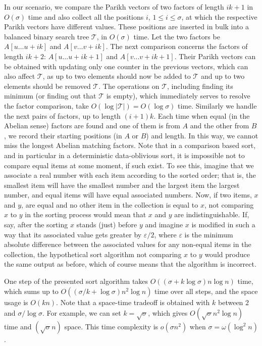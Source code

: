 \documentclass{llncs}
\begin{document}
In our scenario, we compare the Parikh vectors of two factors 
of length $ik+1$ in $O(\sigma)$ time 
and also collect all the positions $i$, $1 \leq i \leq \sigma$, 
at which the respective Parikh vectors have different values.
These positions are inserted in bulk into a balanced binary search 
tree $\mathcal{T}$, in $O(\sigma)$ time.
Let the two factors be $A[u \ldots u+ik]$ and $A[v \ldots v+ik]$.
The next comparison concerns the factors of length $ik+2$: 
$A[u \ldots u+ik+1]$ and $A[v \ldots v+ik+1]$.
Their Parikh vectors can be obtained with updating only one counter 
in the previous vectors, which can also affect $\mathcal{T}$, 
as up to two elements should now be added to $\mathcal{T}$ 
and up to two elements should be removed $\mathcal{T}$. 
The operations on $\mathcal{T}$, including finding its minimum 
(or finding out that $\mathcal{T}$ is empty), 
which immediately serves to resolve the factor comparison, 
take $O(\log|\mathcal{T}|) = O(\log\sigma)$ time.
Similarly we handle the next pairs of factors, up to length $(i+1)k$.
Each time when equal (in the Abelian sense) factors are found 
and one of them is from $A$ and the other from $B$, 
we record their starting positions (in $A$ or $B$) and length.
In this way, we cannot miss the longest Abelian matching factors.
Note that in a comparison based sort, 
and in particular in a deterministic data-oblivious sort,
it is impossible not to compare 
equal items at some moment, if such exist.
To see this, imagine that we associate a real number with 
each item according to the sorted order; that is, the smallest item 
will have the smallest number and the largest item the largest number, 
and equal items will have equal associated numbers.
Now, if two items, $x$ and $y$, are equal and no other item in the collection 
is equal to $x$, not comparing $x$ to $y$ in the sorting process 
would mean that $x$ and $y$ are indistinguishable.
If, say, after the sorting $x$ stands (just) before $y$ 
and imagine $x$ is modified in such a way that its associated value gets 
greater by $\varepsilon/2$, where 
$\varepsilon$ is the minimum absolute difference between the associated values 
for any non-equal items in the collection, the hypothetical
sort algorithm not comparing $x$ to $y$
would produce the same output as before, which of course means 
that the algorithm is incorrect.

One step of the presented sort algorithm takes $O((\sigma + k \log\sigma)n\log n)$ time, 
which sums up to $O( (\sigma/k + \log\sigma)n^2 \log n)$ time over all steps, 
and the space usage is $O(kn)$.
Note that a space-time tradeoff is obtained with $k$ between 
$2$ and $\sigma/\log\sigma$.
For example, we can set $k = \sqrt{\sigma}$, which gives 
$O(\sqrt{\sigma} n^2 \log n)$ time and $(\sqrt{\sigma}n)$ space.
This time complexity is $o(\sigma n^2)$ when $\sigma = \omega(\log^2 n)$.
\end{document}
